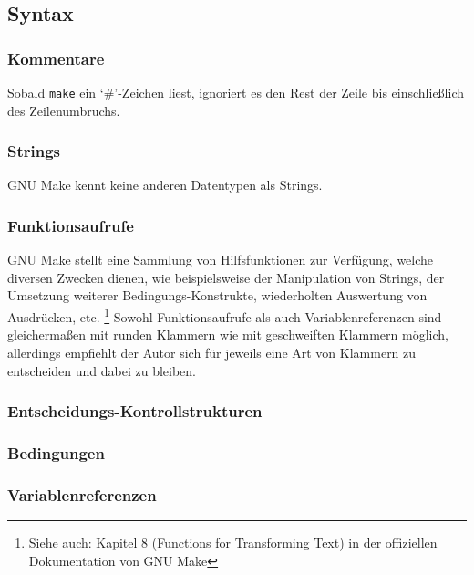 \subsection{Syntax}

\subsubsection*{Kommentare}  
	
	Sobald \texttt{make} ein `\#'-Zeichen liest, ignoriert es den Rest der
	Zeile bis einschließlich des Zeilenumbruchs.
%
\subsubsection*{Strings}  

	GNU Make kennt keine anderen Datentypen als Strings.
%
\subsubsection*{Funktionsaufrufe}  
	
	GNU Make stellt eine Sammlung von Hilfsfunktionen zur Verfügung, welche
	diversen Zwecken dienen, wie beispielsweise der Manipulation von
	Strings, der Umsetzung weiterer Bedingungs-Konstrukte, wiederholten
	Auswertung von Ausdrücken, etc.  \footnote{Siehe auch: Kapitel 8 (Functions
	for Transforming Text) in der offiziellen Dokumentation von GNU Make
	}
%
	Sowohl Funktionsaufrufe als auch Variablenreferenzen sind gleichermaßen
	mit runden Klammern wie mit geschweiften Klammern möglich, allerdings
	empfiehlt der Autor sich für jeweils eine Art von Klammern zu
	entscheiden und dabei zu bleiben.
\subsubsection*{Entscheidungs-Kontrollstrukturen}	

%
\subsubsection*{Bedingungen}  
%
\subsubsection*{Variablenreferenzen}  

	\noindent
	
